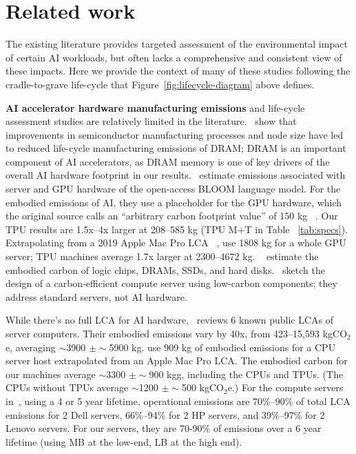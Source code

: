 \section{Related work}
\label{section:related}
The existing literature provides targeted assessment of the environmental impact of certain AI workloads, but often lacks a comprehensive and consistent view of these impacts. Here we provide the context of many of these studies following the cradle-to-grave life-cycle that Figure~\ref{fig:lifecycle-diagram} above defines.

\textbf{AI accelerator hardware manufacturing emissions} and life-cycle assessment studies are relatively limited in the literature. \citet{Kuo2022}~show that improvements in semiconductor manufacturing processes and node size have led to reduced life-cycle manufacturing emissions of DRAM; DRAM is an important component of AI accelerators,  as DRAM memory is one of key drivers of the overall AI hardware footprint in our results. \citet{Luccioni2022}~estimate emissions associated with server and GPU hardware of the open-access BLOOM language model. For the embodied emissions of AI, they use a placeholder for the GPU hardware, which the original source calls an ``arbitrary carbon footprint value'' of 150 kg ~\citep{Davy2021}.  Our TPU results are 1.5x--4x larger at 208--585 kg (TPU M+T in Table ~\ref{tab:specs}). Extrapolating from a 2019 Apple Mac Pro LCA ~\citep{Apple2019}, \citet{Wu2022} use 1808 kg for a whole GPU server; TPU machines average 1.7x larger at 2300--4672 kg.
~\citet{Gupta2022} estimate the embodied carbon of logic chips, DRAMs, SSDs, and hard disks.
\citet{Wang2024}~sketch the design of a carbon-efficient compute server using low-carbon components; they address standard servers, not AI hardware. 

While there's no full LCA for AI hardware,~\citet{Ji2024} reviews 6 known public LCAs of server computers. Their embodied emissions vary by 40x, from 423–15,593 kgCO$_{2}$e, averaging $\sim$3900 $\pm \sim$5900 kg. \citet{Wu2022} use 909 kg of embodied emissions for a CPU server host extrapolated from an Apple Mac Pro LCA. The embodied carbon for our machines average $\sim$3300 $\pm \sim$900 kgg, including the CPUs and TPUs. (The CPUs without TPUs average $\sim$1200 $\pm \sim$500 kgCO$_{2}$e.) For the compute servers in~\citep{Ji2024}, using a 4 or 5 year lifetime, operational emissions are 70\%–90\% of total LCA emissions for 2 Dell servers, 66\%–94\% for 2 HP servers, and 39\%–97\% for 2 Lenovo servers. For our servers, they are 70-90\% of emissions over a 6 year lifetime (using MB at the low-end, LB at the high end).

